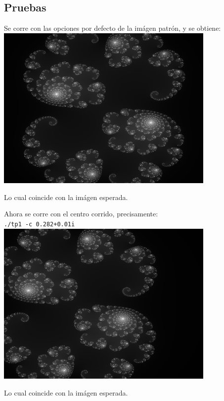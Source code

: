 \subsection{Pruebas}
Se corre con las opciones por defecto de la imágen patrón, y se obtiene:
\bigskip
\includegraphics[width=0.8\textwidth,natwidth=610,natheight=642]{imgs/output.png}

\bigskip
Lo cual coincide con la imágen esperada.

\bigskip
\bigskip
Ahora se corre con el centro corrido, precisamente: \\
\texttt{./tp1 -c 0.282+0.01i}\\
\includegraphics[width=0.8\textwidth,natwidth=610,natheight=642]{imgs/output2.png}

\bigskip

Lo cual coincide con la imágen esperada.\\

